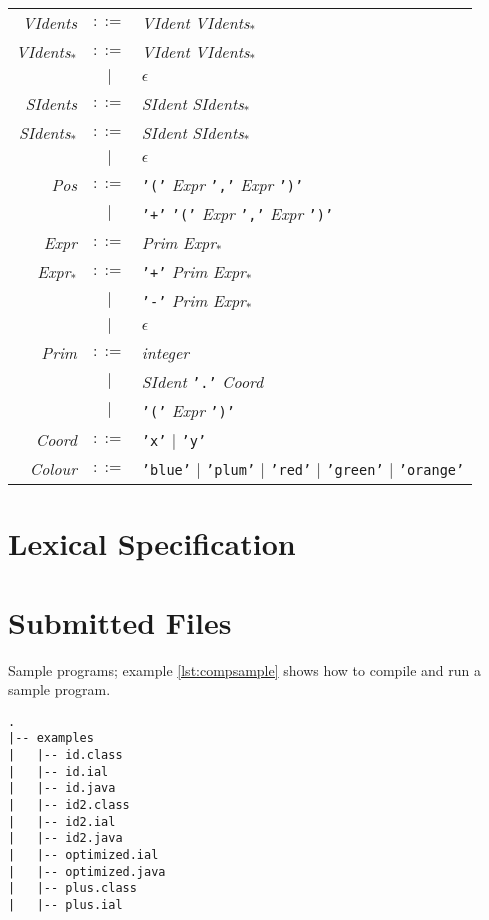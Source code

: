 \documentclass[
paper=a4,
oneside,
fontsize=11pt,
numbers=noenddot,
headinclude=false, %
footinclude=false, %
fleqn,             %
DIV=8
]{scrartcl}
\begin{document}
\begin{table}[h]
\begin{tabularx}{\textwidth}{rcX}
    {\em VIdents}    & $::=$ & {\em VIdent} {\em VIdents$_{*}$}\\
    {\em VIdents$_{*}$}    & $::=$ & {\em VIdent} {\em VIdents$_{*}$}\\
               & $|$   & $\epsilon$\\
    {\em SIdents}    & $::=$ & {\em SIdent} {\em SIdents$_{*}$}\\
    {\em SIdents$_{*}$}    & $::=$ & {\em SIdent} {\em SIdents$_{*}$}\\
               & $|$   & $\epsilon$\\
    {\em Pos}        & $::=$ & {\tt '('} {\em Expr} {\tt ','} {\em Expr} {\tt ')'}\\
               & $|$   & {\tt '+'} {\tt '('} {\em Expr} {\tt ','} {\em Expr} {\tt ')'}\\
    {\em Expr}       & $::=$ & {\em Prim} {\em Expr$_{*}$}\\
    {\em Expr$_{*}$}       & $::=$ & {\tt '+'} {\em Prim} {\em Expr$_{*}$}\\
               & $|$   & {\tt '-'} {\em Prim} {\em Expr$_{*}$}\\
               & $|$   & $\epsilon$\\
    {\em Prim}       & $::=$ & {\em integer}\\
               & $|$   & {\em SIdent} {\tt '.'} {\em Coord}\\
               & $|$   & {\tt '('} {\em Expr} {\tt ')'}\\
    {\em Coord}       & $::=$ & {\tt 'x'} $|$ {\tt 'y'}\\
    {\em Colour}     & $::=$ & {\tt 'blue'} $|$ {\tt 'plum'} $|$ {\tt 'red'} $|$ {\tt 'green'} $|$ {\tt 'orange'}\\
    \bottomrule
  \end{tabularx}
\end{table}

\section{Lexical Specification}

\section{Submitted Files}
\label{sec:submitted-files}

Sample programs; example \ref{lst:compsample} shows how to compile and
run a sample program.

\begin{lstlisting}[caption=File tree under {\tt src/}, label=lst:filetree]
.
|-- examples
|   |-- id.class
|   |-- id.ial
|   |-- id.java
|   |-- id2.class
|   |-- id2.ial
|   |-- id2.java
|   |-- optimized.ial
|   |-- optimized.java
|   |-- plus.class
|   |-- plus.ial
\end{lstlisting}
\end{document}
